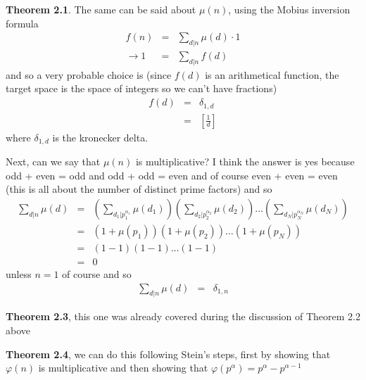 \documentclass[aps,preprint,preprintnumbers,nofootinbib,showpacs,prd]{revtex4-1}
\newcommand{\nbea}{\begin{eqnarray*}}
\newcommand{\neea}{\end{eqnarray*}}
\begin{document}
{\bf Theorem 2.1}. The same can be said about $\mu(n)$, using the Mobius inversion formula
%
\nbea
f(n) & = & \sum_{d|n}\mu(d) \cdot 1 \\
\to 1 & = & \sum_{d|n} f(d)
\neea
%
and so a very probable choice is (since $f(d)$ is an arithmetical function, the target space is the space of integers so we can't have fractions)
%
\nbea
f(d) & = & \delta_{1,d} \\
& = & \left\lbrack \frac{1}{d} \right\rbrack
\neea
%
where $\delta_{1,d}$ is the kronecker delta.

Next, can we say that $\mu(n)$ is multiplicative? I think the answer is yes because odd + even = odd and odd + odd = even and of course even + even = even (this is all about the number of distinct prime factors) and so
%
\nbea
\sum_{d|n}\mu(d) & = & \left(\sum_{d_1|p_1^{\alpha_1}}\mu(d_1)\right)\left(\sum_{d_2|p_2^{\alpha_2}}\mu(d_2)\right) \ldots \left(\sum_{d_N|p_N^{\alpha_N}}\mu(d_N)\right) \\
& = & \left(1+\mu(p_1)\right)\left(1+\mu(p_2)\right) \ldots \left(1+\mu(p_N)\right) \\
& = & (1-1)(1-1) \ldots (1-1) \\
& = & 0
\neea
%
unless $n=1$ of course and so
%
\nbea
\sum_{d|n}\mu(d) & = & \delta_{1,n}
\neea
%

{\bf Theorem 2.3}, this one was already covered during the discussion of Theorem 2.2 above

{\bf Theorem 2.4}, we can do this following Stein's steps, first by showing that $\varphi(n)$ is multiplicative and then showing that $\varphi(p^\alpha) = p^\alpha - p^{\alpha-1}$
\end{document}
